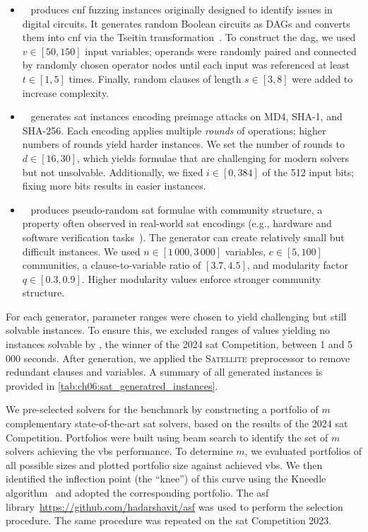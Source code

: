 \begin{itemize}
	\item {}~\citep{BruEtAl10} produces \gls{cnf} fuzzing instances originally designed to identify issues in digital circuits. It generates random Boolean circuits as DAGs and converts them into \gls{cnf} via the Tseitin transformation~\citep{Tseitin83}. To construct the \gls{dag}, we used $v \in [50,150]$ input variables; operands were randomly paired and connected by randomly chosen operator nodes until each input was referenced at least $t \in [1,5]$ times. Finally, random clauses of length $s \in [3,8]$ were added to increase complexity.

	\item {}~\citep{NejEtAl17,AlaEtAl24} generates \gls{sat} instances encoding preimage attacks on MD4, SHA-1, and SHA-256. Each encoding applies multiple \emph{rounds} of operations; higher numbers of rounds yield harder instances. We set the number of rounds to $d \in [16,30]$, which yields formulae that are challenging for modern solvers but not unsolvable. Additionally, we fixed $i \in [0,384]$ of the 512 input bits; fixing more bits results in easier instances.

	\item {}~\citep{GirLev16} produces pseudo-random \gls{sat} formulae with community structure, a property often observed in real-world \gls{sat} encodings (e.g., hardware and software verification tasks~\citep{AnsEtAl12}). The generator can create relatively small but difficult instances. We used $n \in [1\,000, 3\,000]$ variables, $c \in [5,100]$ communities, a clause-to-variable ratio of $[3{.}7, 4{.}5]$, and modularity factor $q \in [0{.}3,0{.}9]$. Higher modularity values enforce stronger community structure.
\end{itemize}

For each generator, parameter ranges were chosen to yield challenging but still solvable instances.  To ensure this, we excluded ranges of values yielding no instances solvable by , the winner of the 2024 \gls{sat} Competition, between 1 and 5\,000 seconds. After generation, we applied the \textsc{Satellite} preprocessor to remove redundant clauses and variables. A summary of all generated instances is provided in \cref{tab:ch06:sat_generatred_instances}.

We pre-selected solvers for the benchmark by constructing a portfolio of $m$ complementary state-of-the-art \gls{sat} solvers, based on the results of the 2024 \gls{sat} Competition. Portfolios were built using beam search to identify the set of $m$ solvers achieving the \gls{vbs} performance. To determine $m$, we evaluated portfolios of all possible sizes and plotted portfolio size against achieved \gls{vbs}. We then identified the inflection point (the ``knee'') of this curve using the Kneedle algorithm~\citep{SatEtAl11} and adopted the corresponding portfolio. The \gls{asf} library~\url{https://github.com/hadarshavit/asf} was used to perform the selection procedure. The same procedure was repeated on the \gls{sat} Competition 2023.

